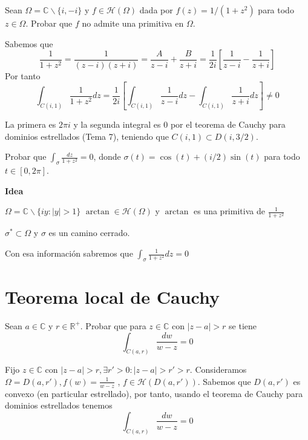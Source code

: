 \begin{ejer}
	Sean $\Omega = \mathbb{C}\backslash \{i,-i\}$ y $f\in\mathcal{H}(\Omega)$ dada por $f(z)=1/(1+z^2)$ para todo $z\in\Omega$. Probar que $f$ no admite una primitiva en $\Omega$.
\end{ejer}

\begin{sol}
	Sabemos que
	$$\frac{1}{1+z^2} = \frac{1}{(z-i)(z+i)} = \frac{A}{z-i} + \frac{B}{z+i} = \frac{1}{2i} \left[ \frac{1}{z-i} - \frac{1}{z+i} \right]$$
	Por tanto
	$$\int_{C(i,1)} \frac{1}{1+z^2} dz = \frac{1}{2i} \left[ \int_{C(i,1)}\frac{1}{z-i}dz - \int_{C(i,1)} \frac{1}{z+i}dz \right] \not = 0$$
	
	La primera es $2\pi i$ y la segunda integral es $0$ por el teorema de Cauchy para dominios estrellados (Tema 7), teniendo que $C(i,1) \subset D(i,3/2)$.
\end{sol}


\begin{ejer}
	Probar que $\int_{\sigma} \frac{dz}{1+z^2} = 0$, donde $\sigma(t) = \cos(t)+(i/2)\sin(t)$ para todo $t\in[0,2\pi]$.
\end{ejer}
\textbf{Idea}

$\Omega = \mathbb{C}\backslash \{ iy : |y|>1 \}$
$\arctan \in \mathcal{H}(\Omega)$ y $\arctan$ es una primitiva de $\frac{1}{1+z^2}$

$\sigma ^{\ast} \subset \Omega$ y $\sigma$ es un camino cerrado.

Con esa información sabremos que 
$\int_{\sigma} \frac{1}{1+z^2} dz = 0$


\newpage


\section{Teorema local de Cauchy}


\begin{ejer}
	Sean $a\in\mathbb{C}$ y $r\in\mathbb{R}^+$. Probar que para $z\in\mathbb{C}$ con $|z-a|>r$ se tiene
	$$ \int_{C(a,r)} \frac{dw}{w-z} = 0 $$
\end{ejer}
\begin{sol}
	Fijo $z\in\mathbb{C}$ con $|z-a|>r, \exists r'>0 : |z-a|>r'>r$.
	Consideramos $\Omega = D(a,r'), f(w) = \frac{1}{w-z}$ , $f\in\mathcal{H}(D(a,r'))$. Sabemos que $D(a,r')$ es convexo (en particular estrellado), por tanto, usando el teorema de Cauchy para dominios estrellados tenemos %
	$$\int_{C(a,r)} \frac{dw}{w-z} = 0$$
\end{sol}


